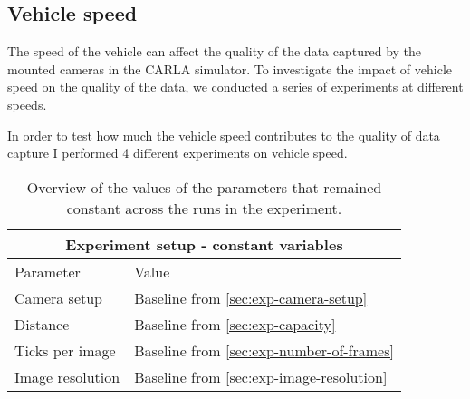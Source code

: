 


















\subsection{Vehicle speed} \label{sec:exp-speed}
The speed of the vehicle can affect the quality of the data captured by the mounted cameras in the CARLA simulator. To investigate the impact of vehicle speed on the quality of the data, we conducted a series of experiments at different speeds.


In order to test how much the vehicle speed contributes to the quality of data capture I performed 4 different experiments on vehicle speed.

\begin{table}[ht]
\centering
\setlength{\tabcolsep}{12pt}
\renewcommand{\arraystretch}{1.2}
\begin{tabular}{l l}
\multicolumn{2}{c}{\textbf{Experiment setup - constant variables}} \\
\hline
Parameter & Value \\
\hline
\cellcolor{blue}Camera setup &\cellcolor{blue}Baseline from \autoref{sec:exp-camera-setup} \\
\cellcolor{blue}Distance &\cellcolor{blue}Baseline from \autoref{sec:exp-capacity} \\
\cellcolor{blue}Ticks per image &\cellcolor{blue}Baseline from \autoref{sec:exp-number-of-frames} \\
\cellcolor{blue}Image resolution &\cellcolor{blue}Baseline from \autoref{sec:exp-image-resolution} \\
\hline
\end{tabular}
\caption{Overview of the values of the parameters that remained constant across the runs in the experiment.}
\label{tab:exp-speed-stable-variables}
\end{table}


